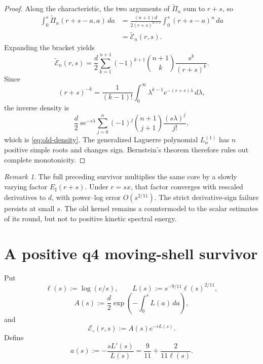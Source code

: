 \documentclass[11pt]{article}
\theoremstyle{remark}
\newtheorem{remark}[theorem]{Remark}
\begin{document}
\begin{proof}
Along the characteristic, the two arguments of
\(\widetilde\Pi_n\) sum to \(r+s\), so
\[
\begin{aligned}
 \int_0^s\widetilde\Pi_n(r+s-a,a)\,da
 &=
 \frac{(n+1)d}{2(r+s)^{n+1}}
 \int_0^s(r+s-a)^n\,da\\
 &=\widetilde{\mathcal E}_n(r,s).
\end{aligned}
\]
Expanding the bracket yields
\[
 \widetilde{\mathcal E}_n(r,s)
 =
 \frac d2\sum_{k=1}^{n+1}
 (-1)^{k+1}\binom{n+1}{k}
 \frac{s^k}{(r+s)^k}.
\]
Since
\[
 (r+s)^{-k}
 =
 \frac1{(k-1)!}\int_0^\infty
 \lambda^{k-1}e^{-(r+s)\lambda}\,d\lambda,
\]
the inverse density is
\[
 \frac d2\,s e^{-s\lambda}
 \sum_{j=0}^n(-1)^j
 \binom{n+1}{j+1}\frac{(s\lambda)^j}{j!},
\]
which is \eqref{eq:old-density}.  The generalized Laguerre polynomial
\(L_n^{(1)}\) has \(n\) positive simple roots and changes sign.
Bernstein's theorem therefore rules out complete monotonicity.
\end{proof}

\begin{remark}
The full preceding survivor multiplies the same core by a slowly varying
factor \(E_\sharp(r+s)\).  Under \(r=sx\), that factor converges with
rescaled derivatives to \(d\), with power--log error \(O(s^{2/11})\).
The strict derivative-sign failure persists at small \(s\).  The old
kernel remains a countermodel to the scalar estimates of its round, but
not to positive kinetic spectral energy.
\end{remark}

\section{A positive q4 moving-shell survivor}

Put
\begin{equation}
\label{eq:L}
 \ell(s):=\log(e/s),
 \qquad
 L(s):=s^{-9/11}\ell(s)^{2/11},
\end{equation}
\begin{equation}
\label{eq:A}
 A(s):=\frac d2
 \exp\left(-\int_0^sL(a)\,da\right),
\end{equation}
and
\begin{equation}
\label{eq:shell-E}
 \mathcal E_\circ(r,s):=A(s)e^{-rL(s)}.
\end{equation}
Define
\begin{equation}
\label{eq:a}
 a(s):=-\frac{sL'(s)}{L(s)}
 =\frac9{11}+\frac{2}{11\ell(s)}.
\end{equation}
\end{document}
